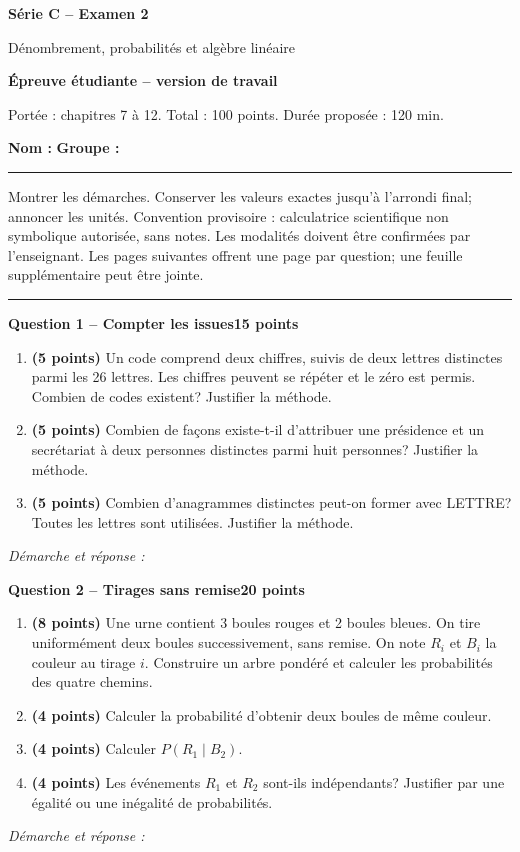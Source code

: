 \documentclass[11pt,a4paper]{article}
\begin{document}
{\LARGE\bfseries Série C -- Examen 2}\par
{\large Dénombrement, probabilités et algèbre linéaire}\par
\textbf{Épreuve étudiante -- version de travail}\par
Portée : chapitres 7 à 12. Total : 100 points. Durée proposée : 120 min.\par
\textbf{Nom :} \hrulefill\quad \textbf{Groupe :} \rule{22mm}{0.3pt}\par
\small Montrer les démarches. Conserver les valeurs exactes jusqu’à l’arrondi final; annoncer les unités. Convention provisoire : calculatrice scientifique non symbolique autorisée, sans notes. Les modalités doivent être confirmées par l’enseignant. Les pages suivantes offrent une page par question; une feuille supplémentaire peut être jointe.\normalsize\par
\vspace{3mm}\hrule\vspace{4mm}
{\large\bfseries Question 1 -- Compter les issues}\hfill\textbf{15 points}\par
\begin{enumerate}
\item \textbf{(5 points)} Un code comprend deux chiffres, suivis de deux lettres distinctes parmi les 26 lettres. Les chiffres peuvent se répéter et le zéro est permis. Combien de codes existent? Justifier la méthode.
\item \textbf{(5 points)} Combien de façons existe-t-il d’attribuer une présidence et un secrétariat à deux personnes distinctes parmi huit personnes? Justifier la méthode.
\item \textbf{(5 points)} Combien d’anagrammes distinctes peut-on former avec LETTRE? Toutes les lettres sont utilisées. Justifier la méthode.
\end{enumerate}
\vspace{3mm}\textit{Démarche et réponse :}\par\vfill

\newpage
{\large\bfseries Question 2 -- Tirages sans remise}\hfill\textbf{20 points}\par
\begin{enumerate}
\item \textbf{(8 points)} Une urne contient 3 boules rouges et 2 boules bleues. On tire uniformément deux boules successivement, sans remise. On note \(R_i\) et \(B_i\) la couleur au tirage \(i\). Construire un arbre pondéré et calculer les probabilités des quatre chemins.
\item \textbf{(4 points)} Calculer la probabilité d’obtenir deux boules de même couleur.
\item \textbf{(4 points)} Calculer \(P(R_1\mid B_2)\).
\item \textbf{(4 points)} Les événements \(R_1\) et \(R_2\) sont-ils indépendants? Justifier par une égalité ou une inégalité de probabilités.
\end{enumerate}
\vspace{3mm}\textit{Démarche et réponse :}\par\vfill
\end{document}
